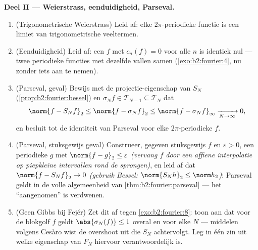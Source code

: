 \begin{problem}
\medskip
\noindent\textbf{Deel II --- Weierstrass, eenduidigheid,
Parseval.}
\begin{enumerate}[resume]
  \item (Trigonometrische Weierstrass) Leid af: elke 
        $2\pi$-periodieke functie is een  limiet van
        trigonometrische veeltermen.
  \item (Eenduidigheid) Leid af: een  $f$ met $c_n(f) = 0$
        voor alle $n$ is identiek nul --- twee 
        periodieke functies met dezelfde 
        vallen samen (\cref{exo:b2:fourier:4}, nu zonder iets aan
        te nemen).
  \item (Parseval,  geval) Bewijs met de
        projectie-eigenschap van $S_N$
        (\cref{prop:b2:fourier:bessel}) en $\sigma_Nf \in \mathcal
        T_{N-1} \subseteq \mathcal T_N$ dat
        \[
        \norm{f - S_Nf}_2 \leq \norm{f - \sigma_Nf}_2
        \leq \norm{f - \sigma_Nf}_\infty
        \xrightarrow[N\to\infty]{} 0 ,
        \]
        en besluit tot de identiteit van Parseval voor elke
        \emph{} $2\pi$-periodieke $f$.
  \item (Parseval, stuksgewijs  geval) Construeer, gegeven
        stuksgewijs  $f$ en $\varepsilon > 0$, een
         periodieke $g$ met $\norm{f - g}_2 \leq
        \varepsilon$ \emph{(vervang $f$ door een affiene
        interpolatie op piepkleine intervallen rond de
        sprongen)}, en leid af dat $\norm{f - S_Nf}_2 \to 0$
        \emph{(gebruik Bessel: $\norm{S_Nh}_2 \leq \norm h_2$)}:
        Parseval geldt in de volle algemeenheid van
        \cref{thm:b2:fourier:parseval} --- het ``aangenomen'' is
        verdwenen.
  \item (Geen Gibbs bij Fejér) Zet dit af tegen
        \cref{exo:b2:fourier:8}: toon aan dat voor de blokgolf $f$
        geldt $\abs{\sigma_N(f)} \leq 1$ overal en voor elke $N$
        --- middelen volgens Cesàro wist de overshoot uit die
        $S_N$ achtervolgt. Leg in één zin uit welke eigenschap van
        $F_N$ hiervoor verantwoordelijk is.
\end{enumerate}


\end{problem}
